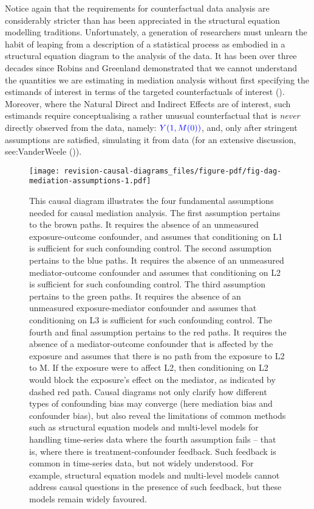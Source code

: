 \documentclass[
  singlecolumn,
  9pt]{article}
\begin{document}
Notice again that the requirements for counterfactual data analysis are
considerably stricter than has been appreciated in the structural
equation modelling traditions. Unfortunately, a generation of
researchers must unlearn the habit of leaping from a description of a
statistical process as embodied in a structural equation diagram to the
analysis of the data. It has been over three decades since Robins and
Greenland demonstrated that we cannot understand the quantities we are
estimating in mediation analysis without first specifying the estimands
of interest in terms of the targeted counterfactuals of interest
(). Moreover, where
the Natural Direct and Indirect Effects are of interest, such estimands
require conceptualising a rather unusual counterfactual that is
\emph{never} directly observed from the data, namely:
\(\textcolor{blue}{Y(1, M(0))}\), and, only after stringent assumptions
are satisfied, simulating it from data (for an extensive discussion,
see:VanderWeele ()).

\begin{figure}

{\centering \texttt{[image: revision-causal-diagrams\_files/figure-pdf/fig-dag-mediation-assumptions-1.pdf]}

}

\caption{\label{fig-dag-mediation-assumptions}This causal diagram
illustrates the four fundamental assumptions needed for causal mediation
analysis. The first assumption pertains to the brown paths. It requires
the absence of an unmeasured exposure-outcome confounder, and assumes
that conditioning on L1 is sufficient for such confounding control. The
second assumption pertains to the blue paths. It requires the absence of
an unmeasured mediator-outcome confounder and assumes that conditioning
on L2 is sufficient for such confounding control. The third assumption
pertains to the green paths. It requires the absence of an unmeasured
exposure-mediator confounder and assumes that conditioning on L3 is
sufficient for such confounding control. The fourth and final assumption
pertains to the red paths. It requires the absence of a mediator-outcome
confounder that is affected by the exposure and assumes that there is no
path from the exposure to L2 to M. If the exposure were to affect L2,
then conditioning on L2 would block the exposure's effect on the
mediator, as indicated by dashed red path. Causal diagrams not only
clarify how different types of confounding bias may converge (here
mediation bias and confounder bias), but also reveal the limitations of
common methods such as structural equation models and multi-level models
for handling time-series data where the fourth assumption fails -- that
is, where there is treatment-confounder feedback. Such feedback is
common in time-series data, but not widely understood. For example,
structural equation models and multi-level models cannot address causal
questions in the presence of such feedback, but these models remain
widely favoured.}

\end{figure}
\end{document}
